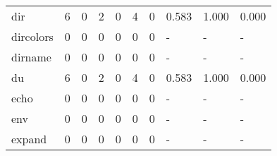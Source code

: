 \begin{longtable}{lp{1.3cm}p{1.3cm}p{1.3cm}p{1.3cm}p{1.3cm}p{1.3cm}p{1.3cm}p{1.3cm}p{1.3cm}}
dir       &                      6 &                                             0 &                                            2 &                                           0 &                                            4 &                                          0 &                                0.583 &                                  1.000 &                                0.000 \\
dircolors &                      0 &                                             0 &                                            0 &                                           0 &                                            0 &                                          0 &                                    - &                                      - &                                    - \\
dirname   &                      0 &                                             0 &                                            0 &                                           0 &                                            0 &                                          0 &                                    - &                                      - &                                    - \\
du        &                      6 &                                             0 &                                            2 &                                           0 &                                            4 &                                          0 &                                0.583 &                                  1.000 &                                0.000 \\
echo      &                      0 &                                             0 &                                            0 &                                           0 &                                            0 &                                          0 &                                    - &                                      - &                                    - \\
env       &                      0 &                                             0 &                                            0 &                                           0 &                                            0 &                                          0 &                                    - &                                      - &                                    - \\
expand    &                      0 &                                             0 &                                            0 &                                           0 &                                            0 &                                          0 &                                    - &                                      - &                                    - \\

\end{longtable}
